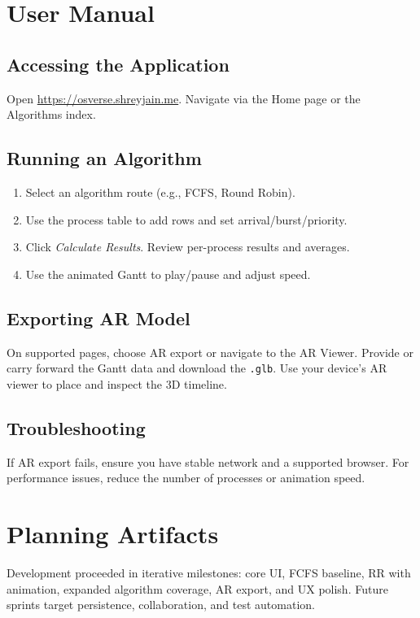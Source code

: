 \documentclass[12pt,a4paper,oneside]{report}
\newcommand{\projectURL}{https://osverse.shreyjain.me}
\begin{document}
\chapter{User Manual}
\section*{Accessing the Application}
Open \href{\projectURL}{\projectURL}. Navigate via the Home page or the Algorithms index.

\section*{Running an Algorithm}
\begin{enumerate}
  \item Select an algorithm route (e.g., FCFS, Round Robin).
  \item Use the process table to add rows and set arrival/burst/priority.
  \item Click \textit{Calculate Results}. Review per-process results and averages.
  \item Use the animated Gantt to play/pause and adjust speed.
\end{enumerate}

\section*{Exporting AR Model}
On supported pages, choose AR export or navigate to the AR Viewer. Provide or carry forward the Gantt data and download the \texttt{.glb}. Use your device’s AR viewer to place and inspect the 3D timeline.

\section*{Troubleshooting}
If AR export fails, ensure you have stable network and a supported browser. For performance issues, reduce the number of processes or animation speed.

\chapter{Planning Artifacts}
Development proceeded in iterative milestones: core UI, FCFS baseline, RR with animation, expanded algorithm coverage, AR export, and UX polish. Future sprints target persistence, collaboration, and test automation.
\end{document}
